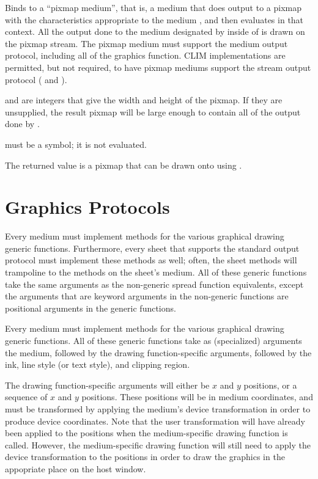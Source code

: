 Binds  to a ``pixmap medium'', that is, a medium that does
output to a pixmap with the characteristics appropriate to the medium
, and then evaluates  in that context.  All the output done
to the medium designated by  inside of  is drawn on
the pixmap stream.  The pixmap medium must support the medium output protocol,
including all of the graphics function.  CLIM implementations are permitted, but
not required, to have pixmap mediums support the stream output protocol
( and ).

 and  are integers that give the width and height of the
pixmap.  If they are unsupplied, the result pixmap will be large enough to
contain all of the output done by .

 must be a symbol; it is not evaluated.

The returned value is a pixmap that can be drawn onto  using
.


\section {Graphics Protocols\label{graphics-protocols}}

Every medium must implement methods for the various graphical drawing generic
functions.  Furthermore, every sheet that supports the standard output protocol
must implement these methods as well; often, the sheet methods will trampoline
to the methods on the sheet's medium.  All of these generic functions take the
same arguments as the non-generic spread function equivalents, except the
arguments that are keyword arguments in the non-generic functions are positional
arguments in the generic functions.

Every medium must implement methods for the various graphical drawing generic
functions.  All of these generic functions take as (specialized) arguments the
medium, followed by the drawing function-specific arguments, followed by the
ink, line style (or text style), and clipping region.

The drawing function-specific arguments will either be $x$ and $y$ positions,
or a sequence of $x$ and $y$ positions.  These positions will be in medium
coordinates, and must be transformed by applying the medium's device
transformation in order to produce device coordinates.  Note that the user
transformation will have already been applied to the positions when the
medium-specific drawing function is called.  However, the medium-specific
drawing function will still need to apply the device transformation to the
positions in order to draw the graphics in the appopriate place on the host
window.

